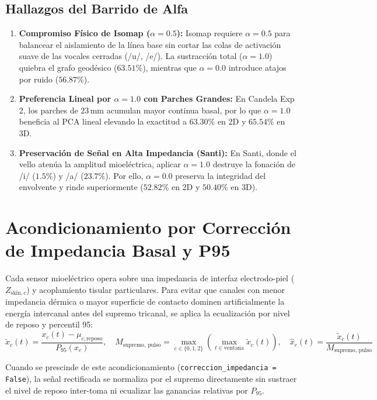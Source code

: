 \documentclass[11pt,a4paper]{article}
\begin{document}
\subsection{Hallazgos del Barrido de Alfa}
\begin{enumerate}
    \item \textbf{Compromiso Físico de Isomap ($\alpha = 0.5$):} Isomap requiere $\alpha = 0.5$ para balancear el aislamiento de la línea base sin cortar las colas de activación suave de las vocales cerradas (/u/, /e/). La sustracción total ($\alpha = 1.0$) quiebra el grafo geodésico ($63.51\%$), mientras que $\alpha = 0.0$ introduce atajos por ruido ($56.87\%$).
    \item \textbf{Preferencia Lineal por $\alpha = 1.0$ con Parches Grandes:} En Candela Exp 2, los parches de $23\,\text{mm}$ acumulan mayor continua basal, por lo que $\alpha = 1.0$ beneficia al PCA lineal elevando la exactitud a $63.30\%$ en 2D y $65.54\%$ en 3D.
    \item \textbf{Preservación de Señal en Alta Impedancia (Santi):} En Santi, donde el vello atenúa la amplitud mioeléctrica, aplicar $\alpha = 1.0$ destruye la fonación de /i/ ($1.5\%$) y /a/ ($23.7\%$). Por ello, $\alpha = 0.0$ preserva la integridad del envolvente y rinde superiormente ($52.82\%$ en 2D y $50.40\%$ en 3D).
\end{enumerate}

\section{Acondicionamiento por Corrección de Impedancia Basal y P95}

Cada sensor mioeléctrico opera sobre una impedancia de interfaz electrodo-piel ($Z_{\text{skin}, c}$) y acoplamiento tisular particulares. Para evitar que canales con menor impedancia dérmica o mayor superficie de contacto dominen artificialmente la energía intercanal antes del supremo tricanal, se aplica la ecualización por nivel de reposo y percentil 95:
\begin{equation}
    \tilde{x}_c(t) = \frac{x_c(t) - \mu_{c,\text{reposo}}}{P_{95}(x_c)}, \quad M_{\text{supremo, pulso}} = \max_{c \in \{0, 1, 2\}} \left( \max_{t \in \text{ventana}} \tilde{x}_c(t) \right), \quad \hat{x}_c(t) = \frac{\tilde{x}_c(t)}{M_{\text{supremo, pulso}}}
\end{equation}

Cuando se prescinde de este acondicionamiento (\texttt{correccion\_impedancia = False}), la señal rectificada se normaliza por el supremo directamente sin sustraer el nivel de reposo inter-toma ni ecualizar las ganancias relativas por $P_{95}$.
\end{document}
